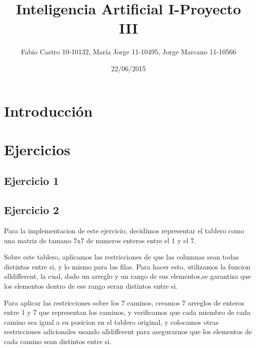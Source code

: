 \documentclass{article}
\title{}
\author{}
\date{}
\begin{document}
 
\title{\Huge Inteligencia Artificial I-Proyecto III }



\author{Fabio Castro 10-10132, María Jorge 11-10495, Jorge Marcano 11-10566} 



\date{22/06/2015}

\maketitle

\section{Introducción}
\hspace{0.5cm}

\section{Ejercicios}
\hspace{0.5cm}
\subsection{Ejercicio 1}

\subsection{Ejercicio 2}


Para la implementacion de este ejercicio, decidimos representar el tablero como una matriz de tamano 7x7 de numeros enteros
entre el 1 y el 7. \par


Sobre este tablero, aplicamos las restricciones de que las columnas sean todas distintas entre si, y lo mismo
para las filas. Para hacer esto, utilizamos la funcion alldifferent, la cual, dado un arreglo y un rango de sus
elementos,se garantiza que los elementos dentro de ese rango seran distintos entre si. \par


Para aplicar las restricciones sobre los 7 caminos, creamos 7 arreglos de enteros entre 1 y 7 que representan los caminos, y
verificamos que cada miembro de cada camino sea igual a su posicion en el tablero original, y colocamos otras restricciones
adicionales usando alldifferent para asegurarnos que los elementos de cada camino sean distintos entre si. \par
\end{document}
